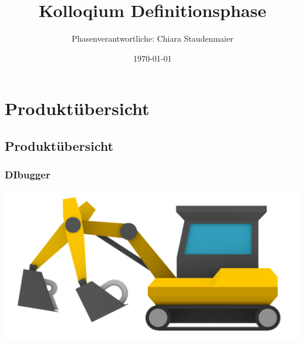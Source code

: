 \documentclass{beamer}
\title[Definitionsphase]{Kolloqium Definitionsphase} %
\author{Phasenverantwortliche: Chiara Staudenmaier} %
\institute[PSE] %
{

}
\date{\today} %
\begin{document}
\begin{frame}
\titlepage %
\end{frame}



\section{Produktübersicht} %

\subsection{Produktübersicht} %

\begin{frame}
\frametitle{DIbugger}
\includegraphics[scale=0.3]{../logo_nongi}
\end{frame}
\end{document}
